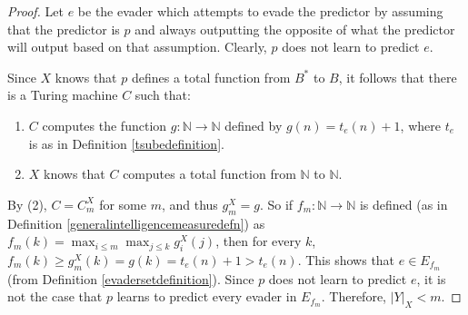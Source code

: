 \documentclass{article}
\begin{document}
\begin{proof}
    Let $e$ be the evader which attempts to evade the predictor by assuming
    that the predictor is $p$ and always outputting the opposite of what
    the predictor will output based on that assumption. Clearly, $p$ does
    not learn to predict $e$.

    Since $X$ knows that $p$ defines a total function from $B^*$ to $B$,
    it follows that there is a Turing machine $C$ such that:
    \begin{enumerate}
        \item
        $C$ computes the function $g:\mathbb N\to \mathbb N$ defined by
        $g(n)=t_e(n)+1$, where $t_e$ is as in
        Definition \ref{tsubedefinition}.
        \item
        $X$ knows that $C$ computes a total function from $\mathbb N$ to $\mathbb N$.
    \end{enumerate}
    By (2), $C=C^X_m$ for some $m$, and thus $g^X_m=g$.
    So if $f_m:\mathbb N\to\mathbb N$ is defined
    (as in Definition \ref{generalintelligencemeasuredefn})
    as $f_m(k)=\max_{i\leq m}\max_{j\leq k}g^X_i(j)$,
    then for every $k$, $f_m(k)\geq g^X_m(k)=g(k)=t_e(n)+1>t_e(n)$.
    This shows that $e\in E_{f_m}$ (from Definition \ref{evadersetdefinition}).
    Since $p$ does not learn to predict $e$,
    it is not the case that $p$ learns to predict every evader in $E_{f_m}$.
    Therefore, $|Y|_X<m$.
\end{proof}



\end{document}

